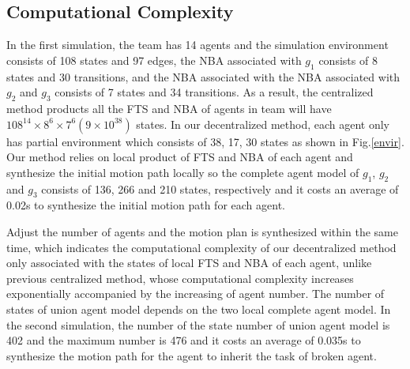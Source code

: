 \documentclass[journal]{IEEEtran}
\begin{document}
\subsection{Computational Complexity}
In the first simulation, the team has 14 agents and the simulation environment consists of 108 states and 97 edges, the NBA associated with $g_1$ consists of 8 states and 30 transitions, and the NBA associated with the NBA associated with $g_2$ and $g_3$ consists of 7 states and 34 transitions. As a result, the centralized method products all the FTS and NBA of agents in team will have $108^{14}\times 8^6 \times 7^6(9\times 10^{38})$ states. In our decentralized method, each agent only has partial environment which consists of 38, 17, 30 states as shown in Fig.\ref{envir}. Our method relies on local product of FTS and NBA of each agent and synthesize the initial motion path locally so the complete agent model of $g_1$, $g_2$ and $g_3$ consists of 136, 266 and 210 states, respectively and it costs an average of 0.02s to synthesize the initial motion path for each agent. \par
Adjust the number of agents and the motion plan is synthesized within the same time, which indicates the computational complexity of our decentralized method only associated with the states of local FTS and NBA of each agent, unlike previous centralized method, whose computational complexity increases exponentially accompanied by the increasing of agent number. The number of states of union agent model depends on the two local complete agent model. In the second simulation, the number of the state number of union agent model is 402 and the maximum number is 476 and it costs an average of 0.035s to synthesize the motion path for the agent to inherit the task of broken agent.

%
\end{document}

